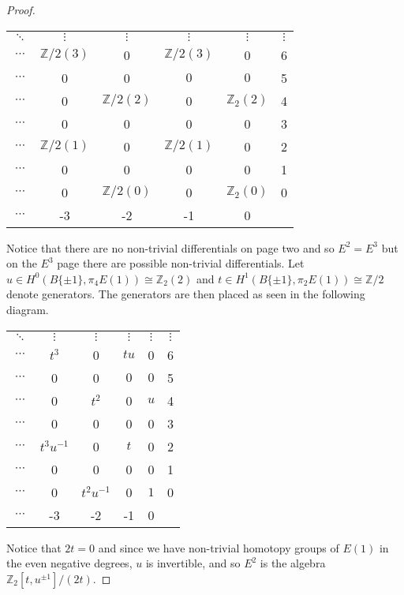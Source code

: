 \documentclass[a4paper]{article} %
\theoremstyle{definition}
\newcommand{\Z}{\mathbb{Z}}
\begin{document}
\begin{proof}
\begin{table}[H]
  \centering
  \setlength{\tabcolsep}{12pt}
  \setlength{\extrarowheight}{2pt}
\begin{tabular}{ccccc|c}
  $\ddots$      & $\vdots$ &   $\vdots$ &  $\vdots$  & $\vdots$  & $\vdots$ \\
  $\cdots$      & $\Z/2(3)$ &   0 &  $\Z/2(3)$  & 0  & 6 \\
  $\cdots$      & 0 &   0 &  $0$  & $0$  & 5 \\
    $\cdots$     & 0  &   $\Z/2(2)$ &  0  & $\Z_2(2)$  & 4 \\
    $\cdots$     &  0 &   0 &  0  &  0 & 3 \\
    $\cdots$     & $\Z/2(1)$  &  0  &  $\Z/2(1)$  &  0 & 2 \\
    $\cdots$     & 0 &  0  &  0  & 0  & 1 \\
    $\cdots$     & 0 &  $\Z/2(0)$  & 0 &  $\Z_2(0)$  & 0 \\ \hline
$\cdots$  & -3 & -2 & -1 & 0 &
\end{tabular}
\end{table}
\noindent Notice that there are no non-trivial differentials on page two and so $E^2 = E^3$ but on the $E^3$ page there are possible non-trivial differentials. Let $u \in H^0(B\{\pm 1\}, \pi_4E(1)) \cong \Z_2(2)$ and $t \in H^1(B\{\pm 1\}, \pi_2E(1)) \cong \Z/2$ denote generators. The generators are then placed as seen in the following diagram.
\begin{table}[H]
  \centering
  \setlength{\tabcolsep}{8pt}
  \setlength{\extrarowheight}{2pt}
\begin{tabular}{ccccc|c}
  $\ddots$      & $\vdots$ &   $\vdots$ &  $\vdots$  & $\vdots$  & $\vdots$ \\
  $\cdots$      & $t^3$ &   0 &  $tu$  & 0  & 6 \\
  $\cdots$      & 0 &   0 &  $0$  & $0$  & 5 \\
    $\cdots$     & 0  &   $t^2$ &  0  & $u$  & 4 \\
    $\cdots$     &  0 &   0 &  0  &  0 & 3 \\
    $\cdots$     & $t^3u^{-1}$  &  0  &  $t$  &  0 & 2 \\
    $\cdots$     & 0 &  0  &  0  & 0  & 1 \\
    $\cdots$     & 0 &  $t^2u^{-1}$  & 0 &  $1$  & 0 \\ \hline
$\cdots$  & -3 & -2 & -1 & 0 &
\end{tabular}
\end{table}
\noindent Notice that $2t=0$
and since we have non-trivial homotopy groups of $E(1)$
in the even negative degrees, $u$ is invertible, and so
$E^2$ is the algebra $\Z_2[t, u^{\pm 1}]/(2t)$.


\end{proof}
\end{document}
